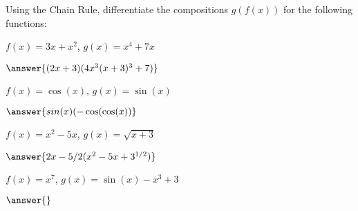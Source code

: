 \documentclass{ximera}
\begin{document}
\begin{question}

Using the Chain Rule, differentiate the compositions $g(f(x))$ for the following functions:

$f(x) = 3x+x^2$, $g(x) = x^4+7x$

$\answer{(2x+3)(4x^3(x+3)^3+7)}$

$f(x) = \cos(x)$, $g(x) = \sin(x)$

$\answer{sin(x)(-\cos(\cos(x))}$

$f(x) = x^2-5x$, $g(x) = \sqrt{x+3}$

$\answer{2x-5/2(x^2-5x+3^{1/2})}$

$f(x) = x^7$, $g(x) = \sin(x)-x^3+3$

$\answer{}$
\end{question}
\end{document}
